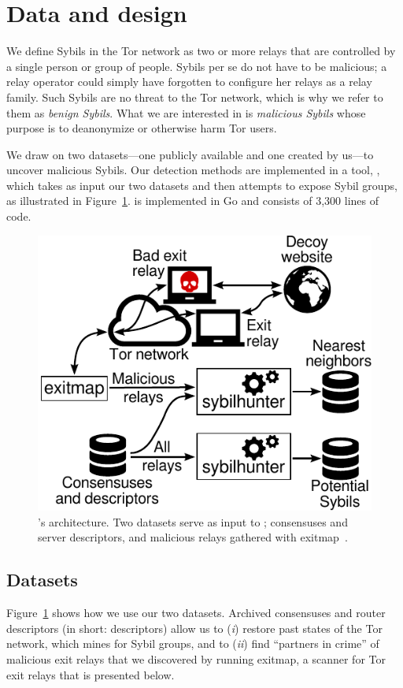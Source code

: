 \section{Data and design}
\label{sec:design}
We define Sybils in the Tor network as two or more relays that are controlled by
a single person or group of people.  Sybils per se do not have to be malicious;
a relay operator could simply have forgotten to configure her relays as a relay
family.  Such Sybils are no threat to the Tor network, which is why we refer to
them as \emph{benign Sybils}.  What we are interested in is \emph{malicious
Sybils} whose purpose is to deanonymize or otherwise harm Tor users.

We draw on two datasets---one publicly available and one created by us---to
uncover malicious Sybils.  Our detection methods are implemented in a tool,
\sys, which takes as input our two datasets and then attempts to expose Sybil
groups, as illustrated in Figure~\ref{fig:system}.  \Sys is implemented in Go
and consists of 3,300 lines of code.

\begin{figure}[t]
	\centering
	\includegraphics[width=0.8\linewidth]{diagrams/architecture.pdf}
	\caption{\Sys's architecture.  Two datasets serve as input to
		\sys; consensuses and server descriptors, and malicious
		relays gathered with exitmap~\cite{Winter2014a}.}
	\label{fig:system}
\end{figure}

\subsection{Datasets}
\label{sec:datasets}
Figure~\ref{fig:system} shows how we use our two datasets.  Archived consensuses
and router descriptors (in short: descriptors) allow us to (\emph{i}) restore
past states of the Tor network, which \sys mines for Sybil groups, and to
(\emph{ii}) find ``partners in crime'' of malicious exit relays that we
discovered by running exitmap, a scanner for Tor exit relays that is presented
below.

